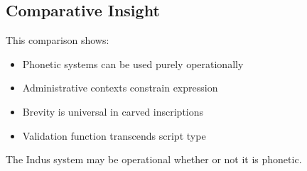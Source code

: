 \subsection{Comparative Insight}

This comparison shows:
\begin{itemize}
    \item Phonetic systems can be used purely operationally
    \item Administrative contexts constrain expression
    \item Brevity is universal in carved inscriptions
    \item Validation function transcends script type
\end{itemize}

The Indus system may be operational whether or not it is phonetic.
